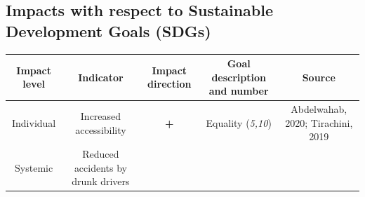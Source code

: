 \documentclass[
]{book}
\begin{document}
\hypertarget{impacts-with-respect-to-sustainable-development-goals-sdgs-34}{%
\subsection*{Impacts with respect to Sustainable Development Goals (SDGs)}\label{impacts-with-respect-to-sustainable-development-goals-sdgs-34}}

\begin{longtable}[]{@{}ccccc@{}}
\toprule
\begin{minipage}[b]{0.17\columnwidth}\centering
Impact level\strut
\end{minipage} & \begin{minipage}[b]{0.16\columnwidth}\centering
Indicator\strut
\end{minipage} & \begin{minipage}[b]{0.17\columnwidth}\centering
Impact direction\strut
\end{minipage} & \begin{minipage}[b]{0.17\columnwidth}\centering
Goal description and number\strut
\end{minipage} & \begin{minipage}[b]{0.17\columnwidth}\centering
Source\strut
\end{minipage}\tabularnewline
\midrule
\endhead
\begin{minipage}[t]{0.17\columnwidth}\centering
Individual\strut
\end{minipage} & \begin{minipage}[t]{0.16\columnwidth}\centering
Increased accessibility\strut
\end{minipage} & \begin{minipage}[t]{0.17\columnwidth}\centering
\textbf{+}\strut
\end{minipage} & \begin{minipage}[t]{0.17\columnwidth}\centering
Equality (\emph{5,10})\strut
\end{minipage} & \begin{minipage}[t]{0.17\columnwidth}\centering
Abdelwahab, 2020; Tirachini, 2019\strut
\end{minipage}\tabularnewline
\begin{minipage}[t]{0.17\columnwidth}\centering
Systemic\strut
\end{minipage} & \begin{minipage}[t]{0.16\columnwidth}\centering
Reduced accidents by drunk drivers\strut

\end{minipage}
\end{longtable}
\end{document}
